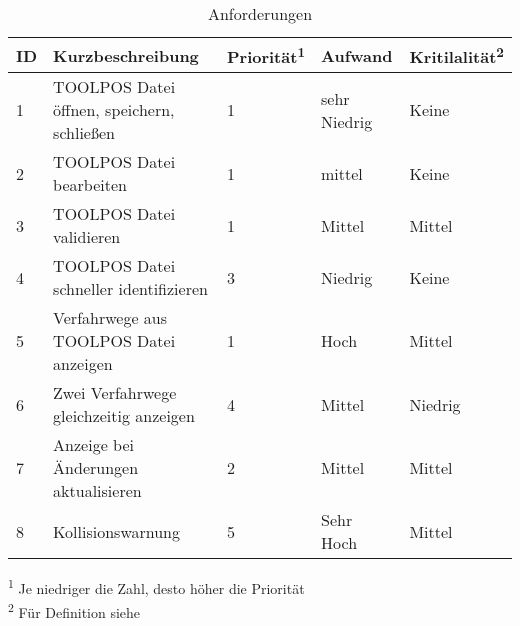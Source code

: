 \begin{table}[H]
    {
        \begin{tabularx}{\linewidth}{|C{0.5cm}|X|C{2.0cm}|C{2.5cm}|C{2.0cm}|}
            \hline
            ID & Kurzbeschreibung & Priorität\textsuperscript{1} & Aufwand & Kritilalität\textsuperscript{2}\\
            \hline
                1
                & TOOLPOS Datei öffnen, speichern, schließen
                & 1
                & sehr Niedrig
                & Keine
                \\
                2
                & TOOLPOS Datei bearbeiten
                & 1
                & mittel
                & Keine
                \\
                3
                & TOOLPOS Datei validieren
                & 1
                & Mittel
                & Mittel
                \\
                4
                & TOOLPOS Datei schneller identifizieren
                & 3
                & Niedrig
                & Keine
                \\
                5
                & Verfahrwege aus TOOLPOS Datei anzeigen
                & 1
                & Hoch
                & Mittel
                \\
                6
                & Zwei Verfahrwege gleichzeitig anzeigen
                & 4
                & Mittel
                & Niedrig
                \\
                7
                & Anzeige bei Änderungen aktualisieren
                & 2
                & Mittel
                & Mittel
                \\
                8
                & Kollisionswarnung
                & 5
                & Sehr Hoch
                & Mittel
                \\
            \hline
        \end{tabularx}
    }
    \caption{Anforderungen}
    \textsuperscript{1} \quad Je niedriger die Zahl, desto höher die Priorität \\
    \textsuperscript{2} \quad Für Definition siehe \cite[]{Balzert:Lehrbuch-der-softwaretechnik}
    \label{tab:anforderungen1}
\end{table}
